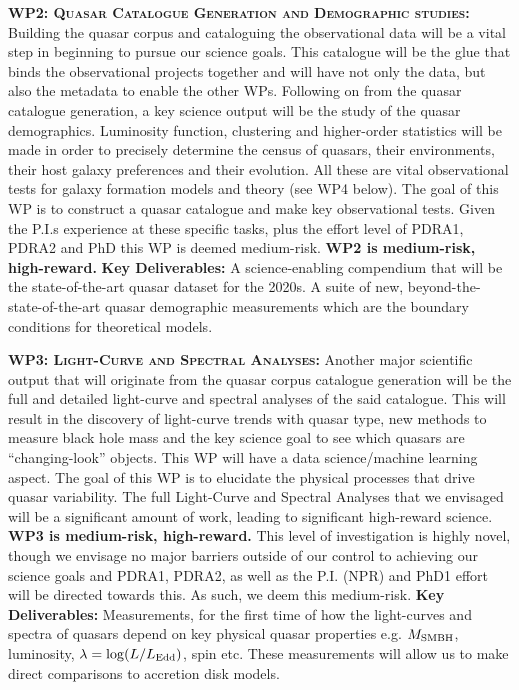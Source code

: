 \documentclass[oneside, a4paper, onecolumn, 11pt]{article}
\begin{document}
\smallskip
\smallskip
\noindent
\textbf{\textsc{WP2: Quasar Catalogue Generation and Demographic studies:}}  
Building the quasar corpus and cataloguing the observational data will
be a vital step in beginning to pursue our science goals. This
catalogue will be the glue that binds the observational projects
together and will have not only the data, but also the metadata to
enable the other WPs.  Following on from the quasar catalogue
generation, a key science output will be the study of the quasar
demographics.  Luminosity function, clustering and higher-order
statistics will be made in order to precisely determine the census of
quasars, their environments, their host galaxy preferences and their
evolution. All these are vital observational tests for galaxy
formation models and theory (see WP4 below). The goal of this WP is to
construct a quasar catalogue and make key observational tests.
Given the P.I.s experience at these specific tasks, plus the effort
level of PDRA1, PDRA2 and PhD this WP is deemed medium-risk.
{\bf WP2 is medium-risk, high-reward.}  {\bf Key Deliverables:} A
science-enabling compendium that will be the state-of-the-art quasar
dataset for the 2020s.  A suite of new, beyond-the-state-of-the-art
quasar demographic measurements which are the boundary conditions for
theoretical models.


\smallskip
\smallskip
\noindent
\textbf{\textsc{WP3: Light-Curve and Spectral Analyses:}} 
Another major scientific output that will originate from the quasar
corpus catalogue generation will be the full and detailed light-curve
and spectral analyses of the said catalogue. This will result in the
discovery of light-curve trends with quasar type, new methods to
measure black hole mass and the key science goal to see which quasars
are ``changing-look'' objects. This WP will have a data
science/machine learning aspect.  The goal of this WP is to elucidate
the physical processes that drive quasar variability.  The full
Light-Curve and Spectral Analyses that we envisaged will be a
significant amount of work, leading to significant high-reward
science.  
%
{\bf WP3 is medium-risk, high-reward.}  
%
This level of investigation is highly novel, though we envisage no
major barriers outside of our control to achieving our science goals
and PDRA1, PDRA2, as well as the P.I. (NPR) and PhD1 effort will be
directed towards this.
%
As such, we deem this medium-risk.  {\bf Key Deliverables:}
Measurements, for the first time of how the light-curves and spectra
of quasars depend on key physical quasar properties e.g. $M_{\rm
SMBH}$, luminosity, $\lambda = \log (L / L_{\rm Edd})$, spin etc.
These measurements will allow us to make direct comparisons to
accretion disk models.
\end{document}
